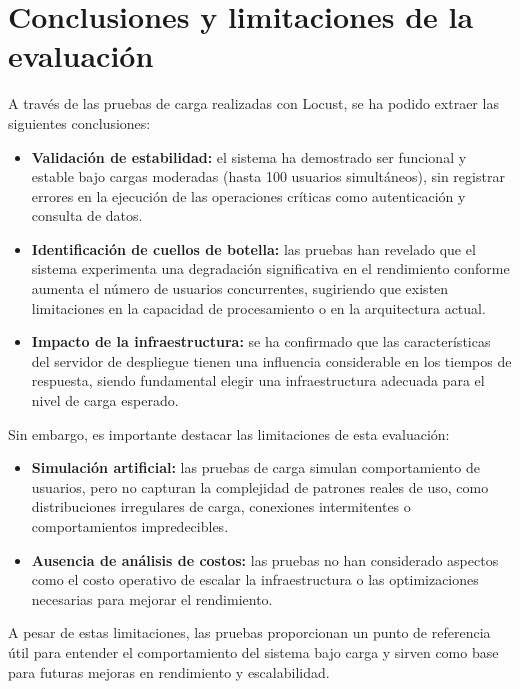 \section{Conclusiones y limitaciones de la evaluación}

A través de las pruebas de carga realizadas con Locust, se ha podido extraer las siguientes conclusiones:

\begin{itemize}
    \item \textbf{Validación de estabilidad:} el sistema ha demostrado ser funcional y estable bajo cargas moderadas (hasta 100 usuarios simultáneos), sin registrar errores en la ejecución de las operaciones 
    críticas como autenticación y consulta de datos.
    
    \item \textbf{Identificación de cuellos de botella:} las pruebas han revelado que el sistema experimenta una degradación significativa en el rendimiento conforme aumenta el número de usuarios concurrentes, 
    sugiriendo que existen limitaciones en la capacidad de procesamiento o en la arquitectura actual.
    
    \item \textbf{Impacto de la infraestructura:} se ha confirmado que las características del servidor de despliegue tienen una influencia considerable en los tiempos de respuesta, siendo fundamental elegir 
    una infraestructura adecuada para el nivel de carga esperado.
\end{itemize}

Sin embargo, es importante destacar las limitaciones de esta evaluación:

\begin{itemize}
    \item \textbf{Simulación artificial:} las pruebas de carga simulan comportamiento de usuarios, pero no capturan la complejidad de patrones reales de uso, como distribuciones irregulares de carga, conexiones 
    intermitentes o comportamientos impredecibles.
    
    \item \textbf{Ausencia de análisis de costos:} las pruebas no han considerado aspectos como el costo operativo de escalar la infraestructura o las optimizaciones necesarias para mejorar el rendimiento.
\end{itemize}

A pesar de estas limitaciones, las pruebas proporcionan un punto de referencia útil para entender el comportamiento del sistema bajo carga y sirven como base para futuras mejoras en rendimiento y escalabilidad.



